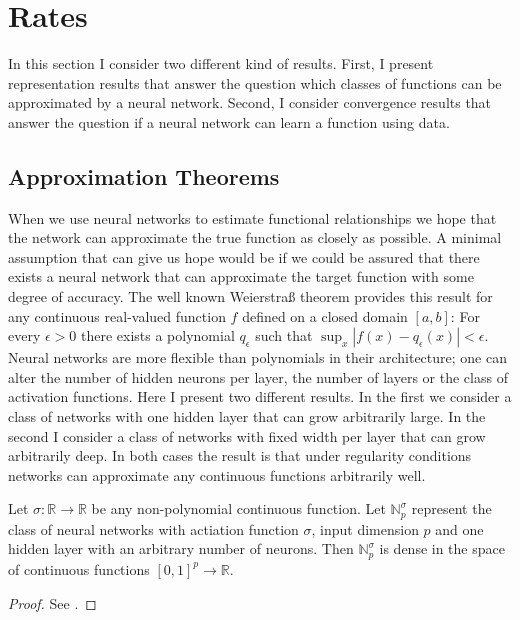 \section{Rates}
\label{seq:rates}

In this section I consider two different kind of results. First, I present
representation results that answer the question which classes of functions can be
approximated by a neural network. Second, I consider convergence results that answer
the question if a neural network can learn a function using data.

\subsection{Approximation Theorems}

When we use neural networks to estimate functional relationships we hope that the
network can approximate the true function as closely as possible. A minimal assumption
that can give us hope would be if we could be assured that there exists a neural
network that can approximate the target function with some degree of accuracy. The
well known Weierstra{\ss} theorem provides this result for any continuous real-valued
function $f$ defined on a closed domain $[a, b]$: For every $\epsilon > 0$ there exists
a polynomial $q_\epsilon$ such that $\sup_{x} |f(x) - q_\epsilon(x)| < \epsilon$.
Neural networks are more flexible than polynomials in their architecture; one can alter
the number of hidden neurons per layer, the number of layers or the class of activation
functions. Here I present two different results. In the first we consider a class of
networks with one hidden layer that can grow arbitrarily large. In the second I consider
a class of networks with fixed width per layer that can grow arbitrarily deep. In both
cases the result is that under regularity conditions networks can approximate any
continuous functions arbitrarily well.

\begin{theorem}
   Let $\sigma : \mathbb{R} \to \mathbb{R}$ be any non-polynomial continuous function.
   Let $\mathbb{N}_p^\sigma$ represent the class of neural networks with actiation
   function $\sigma$, input dimension $p$ and one hidden layer with an arbitrary number
   of neurons. Then $\mathbb{N}_p^\sigma$ is dense in the space of continuous functions
   $[0, 1]^p \to \mathbb{R}$.
\end{theorem}
\begin{proof}
    See \cite{Hornik.1989,Cybenko.1989,Hornik.1991,Pinkus.1999}.
\end{proof}

